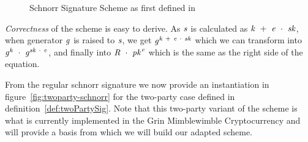 \begin{figure}
    \begin{center}
        \fbox{
        \begin{varwidth}{\textwidth}
            \procedure[linenumbering]{$\procSetup{\varSecParam}$} {
            \varKey \sample \cnstIntegersPrimeWithoutZero{\varPrime} \\
            \pcreturn (\varSecKey \opAssign \varKey \opSeperate \varPubKey \opAssign \funGen{\varKey})
            }
            \procedure[linenumbering]{$\procSign{\varMsg}{\varSecKey}$}{
            \varNonce \sample \cnstIntegersPrimeWithoutZero{\varPrime} \\
            \varRand \opAssign \funGen{\varNonce} \\
            \varSchnorrChallenge \opAssign \funHash{\varMsg \opConc \varRand \opConc \varPubKey} \\
            \varS \opAssign \varNonce \opAddScalar \varSchnorrChallenge \opTimesScalar \varSecKey \\
            \pcreturn \varSignature \opAssign (\varS, \varRand)
            }
            \procedure[linenumbering]{$\procVerf{\varMsg}{\varSignature}{\varPubKey}$} {
            (\varS \opSeperate \varRand) \opFunResult \varSignature \\
            \varSchnorrChallenge \opAssign \funHash{\varMsg \opConc \varRand \opConc \varPubKey} \\
            \pcreturn \funGen{\varS} \opEq \opPointScalar{\varRand}{\varSchnorrChallenge} \opAddPoint \varPubKey
            }
        \end{varwidth}
        }
    \end{center}
    \caption{Schnorr Signature Scheme as first defined in~\cite{schnorr1989efficient}}
    \label{fig:schnorr}
\end{figure}
\textit{Correctness} of the scheme is easy to derive. As $\mathit{s}$ is calculated as $\mathit{k} ~+~ \mathit{e} ~\cdot~ \mathit{sk}$, when generator $\mathit{g}$ is raised to $\mathit{s}$, we get
$\mathit{g}^{\mathit{k} ~+~ \mathit{e} ~\cdot~ \mathit{sk}}$ which we can transform into $\mathit{g}^{\mathit{k}} ~\cdot~ \mathit{g}^{\mathit{sk} ~\cdot~ \mathit{e}}$, and finally
into $\mathit{R} ~\cdot~ \mathit{pk}^{\mathit{e}}$ which is the same as the right side of the equation.

From the regular schnorr signature we now provide an instantiation in figure~\ref{fig:twoparty-schnorr} for the two-party case defined in definition~\ref{def:twoPartySig}. Note that this two-party variant of the scheme is what is
currently implemented in the Grin Mimblewimble Cryptocurrency and will provide a basis from which we will build our adapted scheme.

